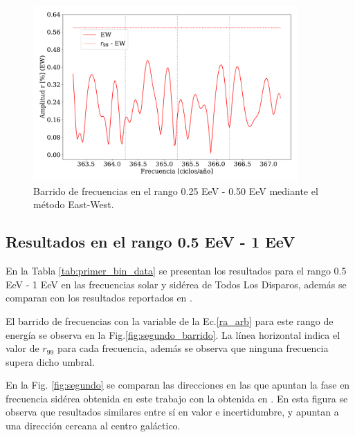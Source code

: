 \begin{figure}[H]
    \begin{small}
        \begin{center}
            \vspace*{-0.6 cm}
            \includegraphics[width=0.9\textwidth]{plot_bin_1_barrido_v3_EW.pdf}
            \vspace*{-0.8 cm}
        \end{center}
        \caption{Barrido de frecuencias en el  rango 0.25 EeV - 0.50 EeV mediante el método East-West.}
        \label{fig:primer_barrido}
    \end{small}
\end{figure}

\subsection{Resultados en el rango 0.5 EeV - 1 EeV}
En la Tabla \ref{tab:primer_bin_data} se presentan los resultados para el rango 0.5 EeV - 1 EeV en las frecuencias solar y sidérea de Todos Los Disparos, además se comparan con los resultados reportados en \cite{Aab_2020}.


El barrido de frecuencias con la variable de la Ec.\ref{ra_arb} para este rango de energía se observa en la Fig.\ref{fig:segundo_barrido}. La línea horizontal indica el valor de $r_{99}$ para cada frecuencia, además se observa que ninguna frecuencia supera dicho umbral. 


En la Fig. \ref{fig:segundo} se comparan las direcciones en las que apuntan la fase en frecuencia sidérea obtenida en este trabajo con la obtenida en \cite{Aab_2020}. En esta figura se observa que resultados similares entre sí en valor e incertidumbre, y apuntan a una dirección cercana al centro galáctico.



